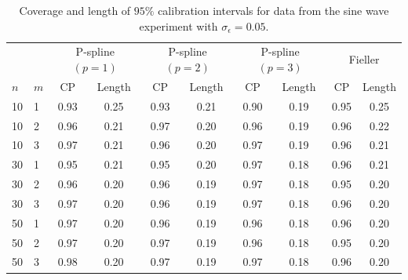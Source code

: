 \documentclass[cmfont,usenames,dvipsnames,leqno]{afit-etd}\usepackage[]{graphicx}\usepackage[]{color}
\begin{document}
\begin{table}[H]%
\centering
  \begin{tabular}{llcccccccc}
  \toprule
  \phantom{abc} & \phantom{abc} & \multicolumn{2}{c}{P-spline $\left(p=1\right)$} & \multicolumn{2}{c}{P-spline $\left(p=2\right)$} & \multicolumn{2}{c}{P-spline $\left(p=3\right)$} & \multicolumn{2}{c}{Fieller} \\
  \cline{3-10}
  $n$ & $m$ & CP & Length & CP & Length & CP & Length & CP & Length \\
  \hline
  10  &  1  & 0.93 & 0.25 & 0.93 & 0.21 & 0.90 & 0.19 & 0.95 & 0.25 \\
  10  &  2  & 0.96 & 0.21 & 0.97 & 0.20 & 0.96 & 0.19 & 0.96 & 0.22 \\
  10  &  3  & 0.97 & 0.21 & 0.96 & 0.20 & 0.97 & 0.19 & 0.96 & 0.21 \\
  \hline
  30  &  1  & 0.95 & 0.21 & 0.95 & 0.20 & 0.97 & 0.18 & 0.96 & 0.21 \\
  30  &  2  & 0.96 & 0.20 & 0.96 & 0.19 & 0.97 & 0.18 & 0.95 & 0.20 \\
  30  &  3  & 0.97 & 0.20 & 0.96 & 0.19 & 0.97 & 0.18 & 0.96 & 0.20 \\
  \hline
  50  &  1  & 0.97 & 0.20 & 0.96 & 0.19 & 0.96 & 0.18 & 0.96 & 0.20 \\
  50  &  2  & 0.97 & 0.20 & 0.97 & 0.19 & 0.96 & 0.18 & 0.95 & 0.20 \\
  50  &  3  & 0.98 & 0.20 & 0.97 & 0.19 & 0.97 & 0.18 & 0.96 & 0.20 \\
  \bottomrule
  \end{tabular}
\caption[Semiparametric calibration Monte Carlo simulation]{Coverage and length of $95\%$ calibration intervals for data from the sine wave experiment with $\sigma_\epsilon = 0.05$. \label{tab:pspline-monte-carlo-1}}
\end{table}
\end{document}
